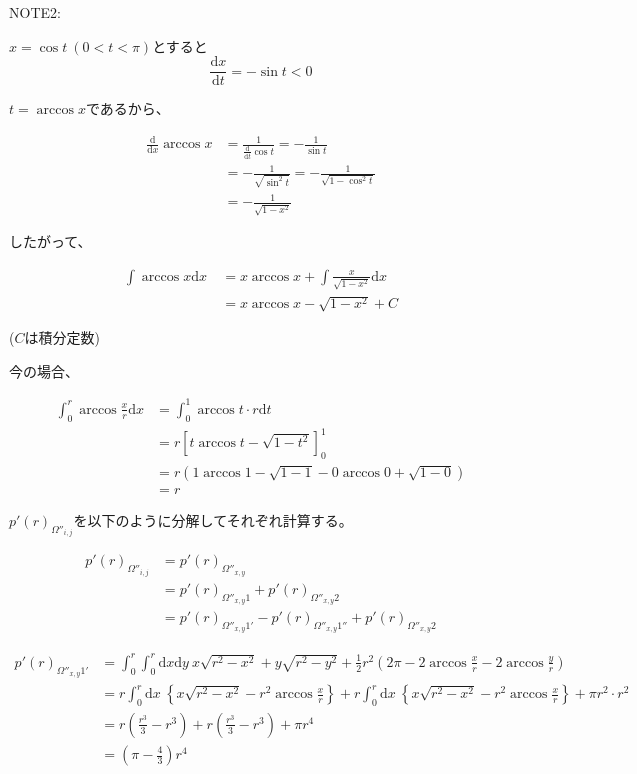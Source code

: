 NOTE2:

$x = \cos t \ (0< t< \pi)$とすると
$$\frac{\mathrm{d}x}{\mathrm{d}t} = - \sin t < 0$$

$t = \arccos x$であるから、

$$\begin{align}
\frac{\mathrm{d}}{\mathrm{d}x}\arccos x &= \frac{1}{\frac{\mathrm{d}}{\mathrm{d}t}\cos t} = -\frac{1}{\sin t}\\
&=- \frac{1}{\sqrt{\sin^{2}t}} = - \frac{1}{\sqrt{1- \cos^{2}t}} \\
&= - \frac{1}{\sqrt{1- x^{2}}}
\end{align}$$

したがって、

$$\begin{align}
\int \arccos x \mathrm{d}x\  &= x\arccos x + \int \frac{x}{\sqrt{1-x^{2}}}\mathrm{d}x\\
&=x\arccos x - \sqrt{1-x^{2}} + C
\end{align}$$

($C$は積分定数)

今の場合、

$$\begin{align}
\int^{r}_{0} \arccos \frac{x}{r} \mathrm{d}x &= \int^{1}_{0}\arccos t \cdot r\mathrm{d}t\\
&= r \left[ t \arccos t - \sqrt{1-t^{2}} \right]^{1}_{0}\\
&= r ( 1\arccos1 -\sqrt{1-1} - 0 \arccos0 + \sqrt{1-0})\\
&= r
\end{align}$$

$p'(r)_{\Omega''_{i,j}}$を以下のように分解してそれぞれ計算する。

$$\begin{align}
p'(r)_{\Omega''_{i,j}} &= p'(r)_{\Omega''_{x, y}}\\
&= p'(r)_{\Omega''_{x, y}1}  +p'(r)_{\Omega''_{x, y}2}\\
&= p'(r)_{\Omega''_{x, y}1'} - p'(r)_{\Omega''_{x, y}1''} + p'(r)_{\Omega''_{x, y}2}
\end{align}$$

$$\begin{align}
p'(r)_{\Omega''_{x,y}1'} &= \int^{r}_{0}\int^{r}_{0}\mathrm{d}x\mathrm{d}y\ x\sqrt{r^{2}-x^{2}} + y \sqrt{r^{2} -y^{2}} + \frac{1}{2}r^{2}\left( 2\pi -2\arccos\frac{x}{r} -2\arccos\frac{y}{r} \right) \\
&= r\int^{r}_{0}\mathrm{d}x\ \left\{x\sqrt{r^{2}-x^{2}} - r^{2}\arccos\frac{x}{r} \right\} 
+ r\int^{r}_{0}\mathrm{d}x\ \left\{x\sqrt{r^{2}-x^{2}} - r^{2}\arccos\frac{x}{r} \right\} + \pi r^{2}\cdot r^{2}\\
&= r\left( \frac{r^{3}}{3} -r^{3} \right) + r\left( \frac{r^{3}}{3} -r^{3} \right) + \pi r^{4}\\
&=  \left(\pi -\frac{4}{3}\right)r^{4}
\end{align}$$


